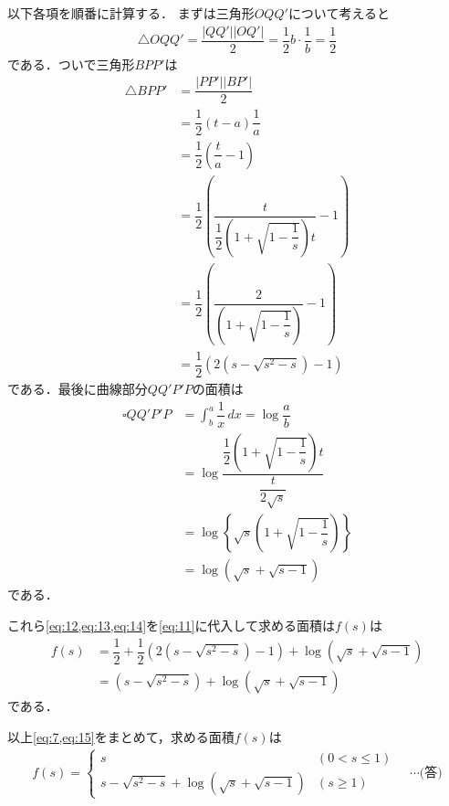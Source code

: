 \documentclass[../../main.tex]{subfiles}
\begin{document}
以下各項を順番に計算する．
まずは三角形$OQQ'$について考えると
\begin{align}
  \triangle OQQ'
  = \dfrac{|QQ'||OQ'|}{2}
  = \dfrac{1}{2}b\cdot\dfrac{1}{b}
  = \dfrac{1}{2} \label{eq:12}
\end{align}
である．ついで三角形$BPP'$は
\begin{align}
  \triangle BPP'
  &= \dfrac{|PP'||BP'|}{2} \\
  &= \dfrac{1}{2}(t-a)\dfrac{1}{a} \\
  &= \dfrac{1}{2}\left(\dfrac{t}{a}-1\right) \\
  &= \dfrac{1}{2}\left(\dfrac{t}{\dfrac{1}{2}\left(1+\sqrt{1-\dfrac{1}{s}}\right)t}-1\right) \\
  &= \dfrac{1}{2}\left(\dfrac{2}{\left(1+\sqrt{1-\dfrac{1}{s}}\right)}-1\right) \\
  &= \dfrac{1}{2}\left(2(s-\sqrt{s^2-s})-1\right) \label{eq:13}
\end{align}
である．最後に曲線部分$QQ'P'P$の面積は
\begin{align}
  \square QQ'P'P
  &= \int_b^a\dfrac{1}{x}\,dx=\log\dfrac{a}{b} \\
  &= \log\dfrac{\dfrac{1}{2}\left(1+\sqrt{1-\dfrac{1}{s}}\right)t}{\dfrac{t}{2\sqrt{s}}} \\
  &= \log\left\{\sqrt{s}\left(1+\sqrt{1-\dfrac{1}{s}}\right)\right\} \\
  &= \log\left(\sqrt{s} + \sqrt{s-1}\right) \label{eq:14}
\end{align}
である．

これら\cref{eq:12,eq:13,eq:14}を\cref{eq:11}に代入して求める面積は$f(s)$は
\begin{align}
  f(s)
  &= \dfrac{1}{2} + \dfrac{1}{2}\left(2(s-\sqrt{s^2-s})-1\right) + \log\left(\sqrt{s} + \sqrt{s-1}\right) \\
  &= (s-\sqrt{s^2-s}) + \log\left(\sqrt{s} + \sqrt{s-1}\right) \label{eq:15}
\end{align}
である．
\casesend

以上\cref{eq:7,eq:15}をまとめて，求める面積$f(s)$は
\begin{align}
  f(s)=
  \begin{cases}
    s & (0 < s\le1) \\
    s-\sqrt{s^2-s}+\log\left(\sqrt{s}+\sqrt{s-1}\right) & (s\ge1)
  \end{cases}
  \quad\cdots\text{(答)}
\end{align}
\end{document}
